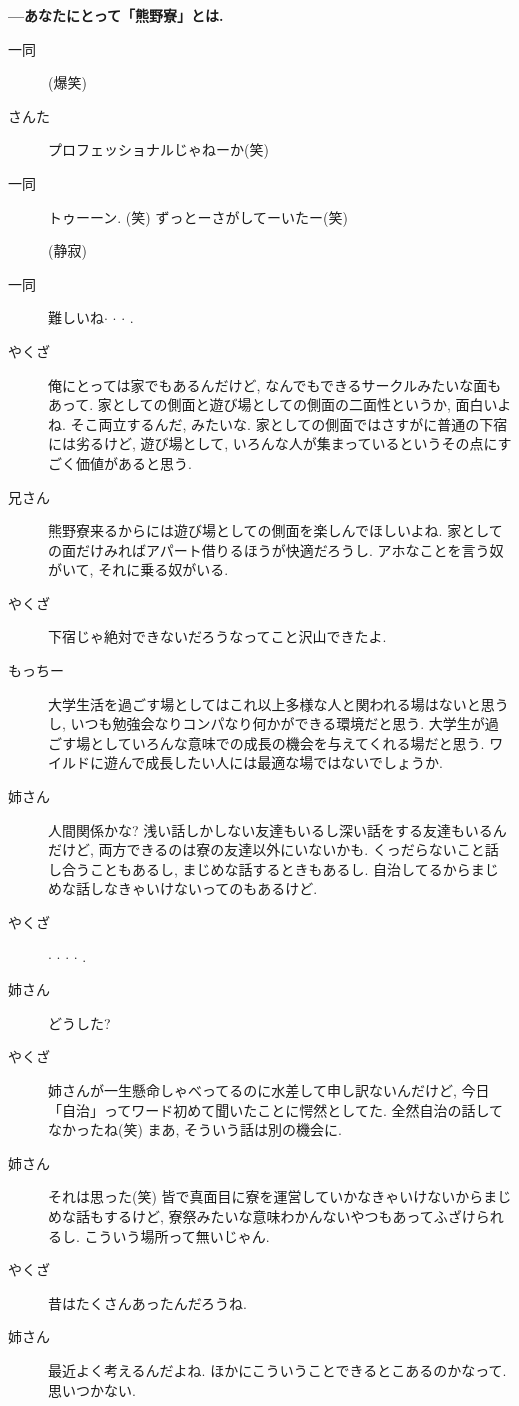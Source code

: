 \documentclass[10pt,b5jsbook,dvips,dvipdfmx,openany]{jsbook}
\theoremstyle{definition}
\begin{document}
		\textbf{---あなたにとって「熊野寮」とは. }
		\begin{description}
		\item[ 一同 ](爆笑)
		\item[さんた]プロフェッショナルじゃねーか(笑)
		\item[ 一同 ]トゥーーン. (笑) ずっとーさがしてーいたー(笑)

		(静寂)

		\item[ 一同 ]難しいね$ \cdot $ $ \cdot $ $ \cdot $ .
		\item[やくざ]俺にとっては家でもあるんだけど, なんでもできるサークルみたいな面もあって. 家としての側面と遊び場としての側面の二面性というか, 面白いよね. そこ両立するんだ, みたいな. 家としての側面ではさすがに普通の下宿には劣るけど, 遊び場として, いろんな人が集まっているというその点にすごく価値があると思う.
		\item[兄さん]熊野寮来るからには遊び場としての側面を楽しんでほしいよね. 家としての面だけみればアパート借りるほうが快適だろうし. アホなことを言う奴がいて, それに乗る奴がいる.
		\item[やくざ]下宿じゃ絶対できないだろうなってこと沢山できたよ.
		\item[もっちー]大学生活を過ごす場としてはこれ以上多様な人と関われる場はないと思うし, いつも勉強会なりコンパなり何かができる環境だと思う. 大学生が過ごす場としていろんな意味での成長の機会を与えてくれる場だと思う. ワイルドに遊んで成長したい人には最適な場ではないでしょうか.
		\item[姉さん]人間関係かな? 浅い話しかしない友達もいるし深い話をする友達もいるんだけど, 両方できるのは寮の友達以外にいないかも. くっだらないこと話し合うこともあるし, まじめな話するときもあるし. 自治してるからまじめな話しなきゃいけないってのもあるけど.
		\item[やくざ]$ \cdot $ $ \cdot $ $ \cdot $ $ \cdot $ .
		\item[姉さん]どうした?
		\item[やくざ]姉さんが一生懸命しゃべってるのに水差して申し訳ないんだけど, 今日「自治」ってワード初めて聞いたことに愕然としてた. 全然自治の話してなかったね(笑) まあ, そういう話は別の機会に.
		\item[姉さん]それは思った(笑) 皆で真面目に寮を運営していかなきゃいけないからまじめな話もするけど, 寮祭みたいな意味わかんないやつもあってふざけられるし. こういう場所って無いじゃん.
		\item[やくざ]昔はたくさんあったんだろうね.
		\item[姉さん]最近よく考えるんだよね. ほかにこういうことできるとこあるのかなって. 思いつかない.

\end{description}
\end{document}
